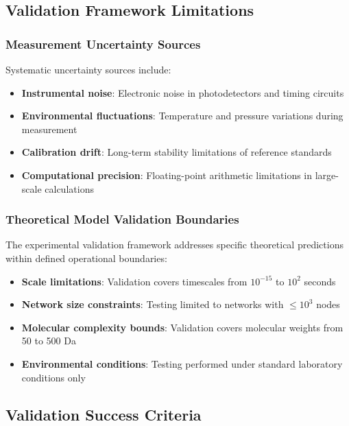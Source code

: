\subsection{Validation Framework Limitations}

\subsubsection{Measurement Uncertainty Sources}

Systematic uncertainty sources include:

\begin{itemize}
\item \textbf{Instrumental noise}: Electronic noise in photodetectors and timing circuits
\item \textbf{Environmental fluctuations}: Temperature and pressure variations during measurement
\item \textbf{Calibration drift}: Long-term stability limitations of reference standards
\item \textbf{Computational precision}: Floating-point arithmetic limitations in large-scale calculations
\end{itemize}

\subsubsection{Theoretical Model Validation Boundaries}

The experimental validation framework addresses specific theoretical predictions within defined operational boundaries:

\begin{itemize}
\item \textbf{Scale limitations}: Validation covers timescales from $10^{-15}$ to $10^{2}$ seconds
\item \textbf{Network size constraints}: Testing limited to networks with $\leq 10^3$ nodes
\item \textbf{Molecular complexity bounds}: Validation covers molecular weights from 50 to 500 Da  
\item \textbf{Environmental conditions}: Testing performed under standard laboratory conditions only
\end{itemize}

\subsection{Validation Success Criteria}

